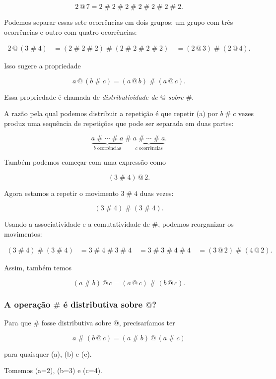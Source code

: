 \documentclass[12pt,a4paper]{article}
\makeatletter
\newcommand{\mov}{\mathbin{\#}}
\newcommand{\rep}{\mathbin{@}}
\makeatother
\begin{document}
\[
2\rep7
=
2\mov2\mov2\mov2\mov2\mov2\mov2.
\]

Podemos separar essas sete ocorrências em dois grupos: um grupo com três
ocorrências e outro com quatro ocorrências:

\[
\begin{aligned}
2\rep(3\mov4)
&=
(2\mov2\mov2)
\mov
(2\mov2\mov2\mov2)\
&=
(2\rep3)\mov(2\rep4).
\end{aligned}
\]

Isso sugere a propriedade

\[
a\rep(b\mov c)
=
(a\rep b)\mov(a\rep c).
\]

Essa propriedade é chamada de \emph{distributividade de $\rep$ sobre
$\mov$}.

A razão pela qual podemos distribuir a repetição é que repetir (a)
por $b\mov c$ vezes produz uma sequência de repetições que pode ser
separada em duas partes:

\[
\underbrace{a\mov\cdots\mov a}
_{b\text{ ocorrências}}
\mov
\underbrace{a\mov\cdots\mov a}
_{c\text{ ocorrências}}.
\]

Também podemos começar com uma expressão como

\[
(3\mov4)\rep2.
\]

Agora estamos a repetir o movimento $3\mov4$ duas vezes:

\[
(3\mov4)\mov(3\mov4).
\]

Usando a associatividade e a comutatividade de $\mov$, podemos
reorganizar os movimentos:

\[
\begin{aligned}
(3\mov4)\mov(3\mov4)
&=3\mov4\mov3\mov4\
&=3\mov3\mov4\mov4\
&=(3\rep2)\mov(4\rep2).
\end{aligned}
\]

Assim, também temos

\[
(a\mov b)\rep c
=
(a\rep c)\mov(b\rep c).
\]

\subsubsection{A operação \texorpdfstring{$\mov$}{\#} é distributiva sobre \texorpdfstring{$\rep$}{@}?}

Para que $\mov$ fosse distributiva sobre $\rep$, precisaríamos ter

\[
a\mov(b\rep c)
=
(a\mov b)\rep(a\mov c)
\]

para quaisquer (a), (b) e (c).

Tomemos (a=2), (b=3) e (c=4).
\end{document}
